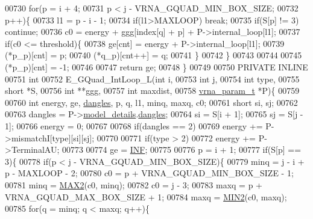 \begin{DoxyCode}
00730     \textcolor{keywordflow}{for}(p = i + 4;
00731         p < j - VRNA\_GQUAD\_MIN\_BOX\_SIZE;
00732         p++)\{
00733       l1    = p - i - 1;
00734       \textcolor{keywordflow}{if}(l1>MAXLOOP) \textcolor{keywordflow}{break};
00735       \textcolor{keywordflow}{if}(S[p] != 3) \textcolor{keywordflow}{continue};
00736       c0  = energy + ggg[index[q] + p] + P->internal\_loop[l1];
00737         \textcolor{keywordflow}{if}(c0 <= threshold)\{
00738           ge[cnt]       = energy + P->internal\_loop[l1];
00739           (*p\_p)[cnt]   = p;
00740           (*q\_p)[cnt++] = q;
00741         \}
00742     \}
00743 
00744 
00745   (*p\_p)[cnt] = -1;
00746 
00747   \textcolor{keywordflow}{return} ge;
00748 \}
00749 
00750 PRIVATE INLINE
00751 \textcolor{keywordtype}{int}
00752 E\_GQuad\_IntLoop\_L(\textcolor{keywordtype}{int} i,
00753                   \textcolor{keywordtype}{int} j,
00754                   \textcolor{keywordtype}{int} type,
00755                   \textcolor{keywordtype}{short} *S,
00756                   \textcolor{keywordtype}{int} **ggg,
00757                   \textcolor{keywordtype}{int} maxdist,
00758                   \hyperlink{group__energy__parameters_structvrna__param__s}{vrna\_param\_t} *P)\{
00759 
00760   \textcolor{keywordtype}{int} energy, ge, \hyperlink{group__model__details_ga72b511ed1201f7e23ec437e468790d74}{dangles}, p, q, l1, minq, maxq, c0;
00761   \textcolor{keywordtype}{short} si, sj;
00762 
00763   dangles = P->\hyperlink{group__energy__parameters_a7b84353eb9075c595bad4ceb871bcae7}{model\_details}.\hyperlink{structvrna__md__s_adcda4ff2ea77748ae0e8700288282efc}{dangles};
00764   si      = S[i + 1];
00765   sj      = S[j - 1];
00766   energy  = 0;
00767 
00768   \textcolor{keywordflow}{if}(dangles == 2)
00769     energy += P->mismatchI[type][si][sj];
00770 
00771   \textcolor{keywordflow}{if}(type > 2)
00772     energy += P->TerminalAU;
00773 
00774   ge = \hyperlink{energy__const_8h_a12c2040f25d8e3a7b9e1c2024c618cb6}{INF};
00775 
00776   p = i + 1;
00777   \textcolor{keywordflow}{if}(S[p] == 3)\{
00778     \textcolor{keywordflow}{if}(p < j - VRNA\_GQUAD\_MIN\_BOX\_SIZE)\{
00779       minq  = j - i + p - MAXLOOP - 2;
00780       c0    = p + VRNA\_GQUAD\_MIN\_BOX\_SIZE - 1;
00781       minq  = \hyperlink{group__utils_gadd91367918fadbc8d585940d6206d6d2}{MAX2}(c0, minq);
00782       c0    = j - 3;
00783       maxq  = p + VRNA\_GQUAD\_MAX\_BOX\_SIZE + 1;
00784       maxq  = \hyperlink{group__utils_ga2dd4a927a7f937f43a90c144d79107d8}{MIN2}(c0, maxq);
00785       \textcolor{keywordflow}{for}(q = minq; q < maxq; q++)\{

\end{DoxyCode}
